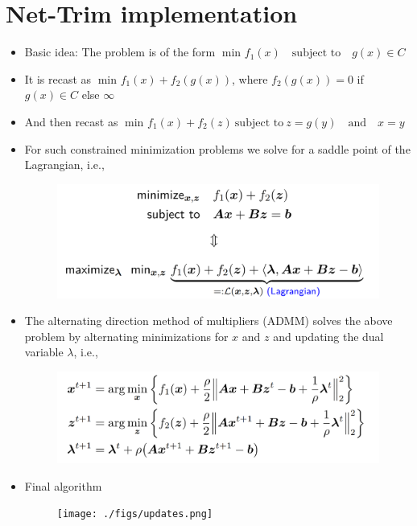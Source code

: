 \section{Net-Trim implementation}
\begin{itemize}
	\item Basic idea: The problem is of the form
	$\min_{}f_1(x) \quad \text{subject to} \quad g(x) \in C$
	\item It is recast as $\min_{}f_1(x) + f_2(g(x))$, where $f_2(g(x)) = 0$ if $g(x) \in C$ else $\infty$
	\item And then recast as $\min_{}f_1(x) + f_2(z) \ \text{subject to} \ z = g(y)\quad \text{and} \quad x = y$
	\item For such constrained minimization problems we solve for a saddle point of the Lagrangian, i.e., 
	\setlength{\belowcaptionskip}{-30pt}
	\begin{figure}[H]
	\centering
	\includegraphics[width=.7\linewidth]{./figs/dual.png}  
	\caption*{}
\end{figure}
	\item The alternating direction method of multipliers (ADMM) solves the above problem by alternating minimizations for $x$ and $z$ and updating the dual variable $\lambda$, i.e., 
	\begin{figure}[H]
		\centering
		\includegraphics[width=.7\linewidth]{./figs/admm.png}  
		\caption*{}
	\end{figure}	 
	\item Final algorithm
		\begin{figure}[H]
		\centering
		\texttt{[image: ./figs/updates.png]}  
		\caption*{}
	\end{figure}
	
\end{itemize}
